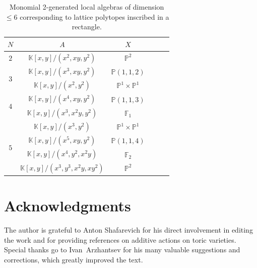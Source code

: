 \documentclass[a4paper,draft,reqno,12pt]{amsart}
\theoremstyle{definition}
\theoremstyle{definition}
\theoremstyle{remark}
\def\BK{{\mathbb K}}
\def\BF{{\mathbb F}}
\def\BK{{\mathbb K}}
\def\BP{{\mathbb P}}
\begin{document}
\begin{center}
\begin{table}[h]
\begin{tabular}{ |Sc|Sc|Sc| } 
\hline
$N$  & $A$ & $X$ \\
\hline
{} &  $ \BK[x,y]/(x^2,xy,y^2)$ & $\BP^2$ \\
\hline
{} & $\BK[x,y]/(x^3,xy,y^2)$ & $\BP(1,1,2)$ \\
& $\BK[x,y]/(x^2,y^2)$ & $\BP^1\times\BP^1$ \\
\hline
{} &  $ \BK[x,y]/(x^4,xy,y^2)$ & $\BP(1,1,3)$ \\ 
&   $\BK[x,y]/(x^3,x^2y,y^2)$ & $\BF_1$ \\ 
\hline
{} & $\BK[x,y]/(x^3,y^2)$ & $\BP^1\times\BP^1$ \\
& $\BK[x,y]/(x^5,xy,y^2)$ & $\BP(1,1,4)$ \\
& $\BK[x,y]/(x^4,y^2,x^2y)$ & $\BF_2$ \\
&  $\BK[x,y]/(x^3,y^3,x^2y,xy^2)$ & $\BP^2$ \\
\hline
\end{tabular}
\caption{
    Monomial 2-generated local algebras of dimension $\leq 6$ corresponding to lattice polytopes inscribed in a rectangle.}
\end{table}
\end{center}

\section*{Acknowledgments}

The author is grateful to Anton Shafarevich for his direct involvement in editing the work and for providing references on additive actions on toric varieties. Special thanks go to Ivan~Arzhantsev for his many valuable suggestions and corrections, which greatly improved the text.
\end{document}
